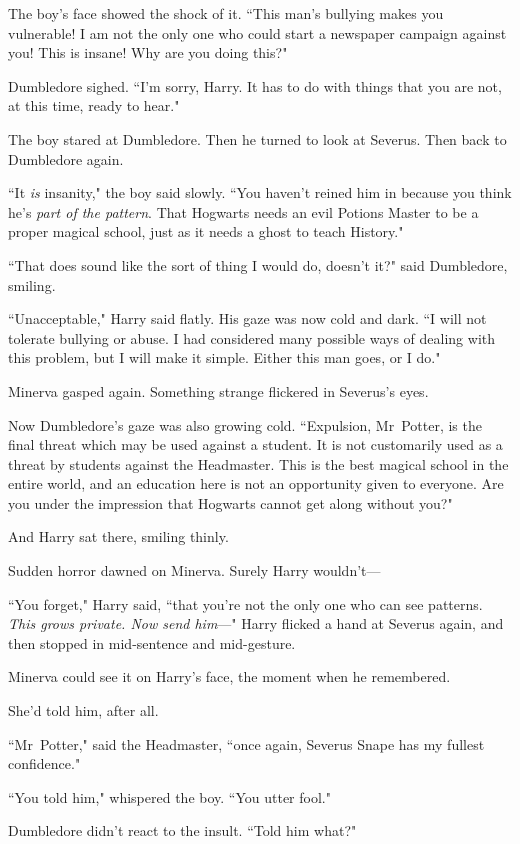The boy's face showed the shock of it. ``This man's bullying makes you vulnerable! I am not the only one who could start a newspaper campaign against you! This is insane! Why are you doing this?"

Dumbledore sighed. ``I'm sorry, Harry. It has to do with things that you are not, at this time, ready to hear."

The boy stared at Dumbledore. Then he turned to look at Severus. Then back to Dumbledore again.

``It \emph{is} insanity," the boy said slowly. ``You haven't reined him in because you think he's \emph{part of the pattern}. That Hogwarts needs an evil Potions Master to be a proper magical school, just as it needs a ghost to teach History."

``That does sound like the sort of thing I would do, doesn't it?" said Dumbledore, smiling.

``Unacceptable," Harry said flatly. His gaze was now cold and dark. ``I will not tolerate bullying or abuse. I had considered many possible ways of dealing with this problem, but I will make it simple. Either this man goes, or I do."

Minerva gasped again. Something strange flickered in Severus's eyes.

Now Dumbledore's gaze was also growing cold. ``Expulsion, Mr~Potter, is the final threat which may be used against a student. It is not customarily used as a threat by students against the Headmaster. This is the best magical school in the entire world, and an education here is not an opportunity given to everyone. Are you under the impression that Hogwarts cannot get along without you?"

And Harry sat there, smiling thinly.

Sudden horror dawned on Minerva. Surely Harry wouldn't—

``You forget," Harry said, ``that you're not the only one who can see patterns. \emph{This grows private. Now send him}—" Harry flicked a hand at Severus again, and then stopped in mid-sentence and mid-gesture.

Minerva could see it on Harry's face, the moment when he remembered.

She'd told him, after all.

``Mr~Potter," said the Headmaster, ``once again, Severus Snape has my fullest confidence."

``You told him," whispered the boy. ``You utter fool."

Dumbledore didn't react to the insult. ``Told him what?"

